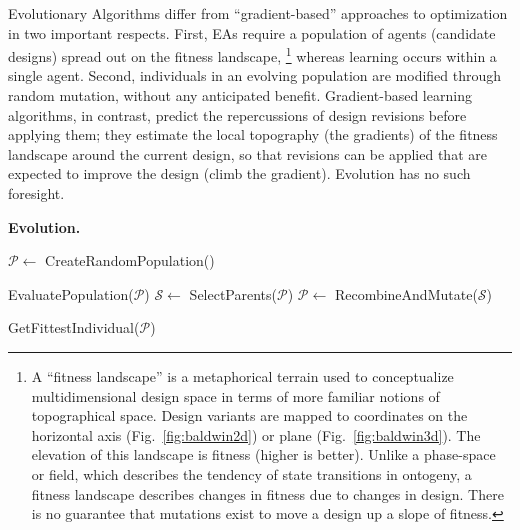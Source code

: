 Evolutionary Algorithms \cite{fogel1998evolutionary,cliff1993explorations,floreano1996homing,harvey1997evolutionary,nolfi2000evolutionary} differ from ``gradient-based'' approaches to optimization in two important respects.
First, EAs require a population of agents (candidate designs) spread out on the fitness landscape,%
\footnote{%
A ``fitness landscape'' is a metaphorical terrain
used to conceptualize multidimensional design space in terms of more familiar notions of topographical space.
Design variants are mapped to coordinates on the horizontal axis (Fig.~\ref{fig:baldwin2d}) or plane (Fig.~\ref{fig:baldwin3d}).
The elevation of this landscape is fitness (higher is better).
Unlike a phase-space or field, which describes the tendency of state transitions in ontogeny, a fitness landscape describes changes in fitness due to changes in design.
There is no guarantee that mutations exist to move a design up a slope of fitness.
} 
whereas learning occurs within a single agent.
Second, individuals in an evolving population are modified through random mutation, without any anticipated benefit.
Gradient-based learning algorithms, in contrast, predict the repercussions of design revisions before applying them;
they estimate the local topography (the gradients) of the fitness landscape around the current design,
so that revisions can be applied that are expected to improve the design (climb the gradient).
Evolution has no such foresight.


\begin{algorithm}
\caption{\textbf{Evolution.}}\label{alg:evo}
\begin{algorithmic}[1]
\State $\mathcal{P} \gets$ CreateRandomPopulation() 

\State EvaluatePopulation($\mathcal{P}$) 
\State $\mathcal{S} \gets $ SelectParents($\mathcal{P}$)
\State $\mathcal{P} \gets $ RecombineAndMutate($\mathcal{S}$)  

\EndWhile
\State \Return GetFittestIndividual($\mathcal{P}$) 
\end{algorithmic}
\end{algorithm}




